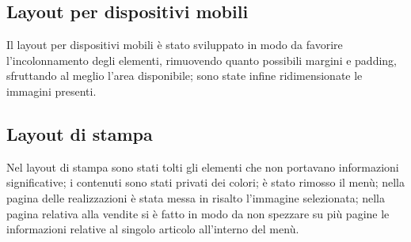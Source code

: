 {	\subsection{Layout per dispositivi mobili}{
		Il layout per dispositivi mobili è stato sviluppato in modo da favorire l'incolonnamento degli elementi, rimuovendo quanto possibili margini e padding, sfruttando al meglio l'area disponibile; sono state infine ridimensionate le immagini presenti.
	}
	\subsection{Layout di stampa}{
		Nel layout di stampa sono stati tolti gli elementi che non portavano informazioni significative; i contenuti sono stati privati dei colori; è stato rimosso il menù; nella pagina delle realizzazioni è stata messa in risalto l'immagine selezionata; nella pagina relativa alla vendite si è fatto in modo da non spezzare su più pagine le informazioni relative al singolo articolo all'interno del menù.
	}
}
